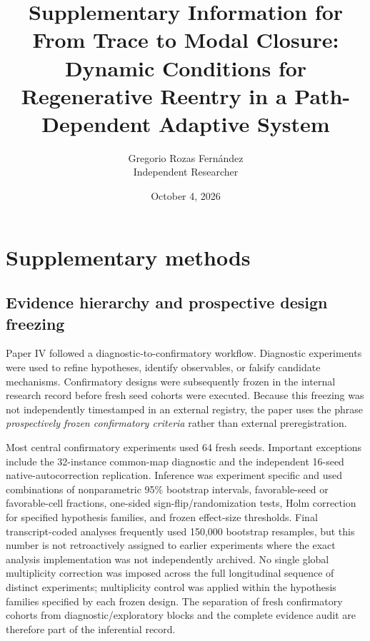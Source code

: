 \documentclass[11pt]{article}
\begin{document}
\title{Supplementary Information for\\From Trace to Modal Closure: Dynamic Conditions for Regenerative Reentry in a Path-Dependent Adaptive System}
\author{Gregorio Rozas Fern\'andez \\ Independent Researcher}
\date{October 4, 2026}
\maketitle

\section{Supplementary methods}

\subsection{Evidence hierarchy and prospective design freezing}

Paper IV followed a diagnostic-to-confirmatory workflow. Diagnostic experiments were used to refine hypotheses, identify observables, or falsify candidate mechanisms. Confirmatory designs were subsequently frozen in the internal research record before fresh seed cohorts were executed. Because this freezing was not independently timestamped in an external registry, the paper uses the phrase \emph{prospectively frozen confirmatory criteria} rather than external preregistration.

Most central confirmatory experiments used 64 fresh seeds. Important exceptions include the 32-instance common-map diagnostic and the independent 16-seed native-autocorrection replication. Inference was experiment specific and used combinations of nonparametric 95\% bootstrap intervals, favorable-seed or favorable-cell fractions, one-sided sign-flip/randomization tests, Holm correction for specified hypothesis families, and frozen effect-size thresholds. Final transcript-coded analyses frequently used 150,000 bootstrap resamples, but this number is not retroactively assigned to earlier experiments where the exact analysis implementation was not independently archived. No single global multiplicity correction was imposed across the full longitudinal sequence of distinct experiments; multiplicity control was applied within the hypothesis families specified by each frozen design. The separation of fresh confirmatory cohorts from diagnostic/exploratory blocks and the complete evidence audit are therefore part of the inferential record.
\end{document}
